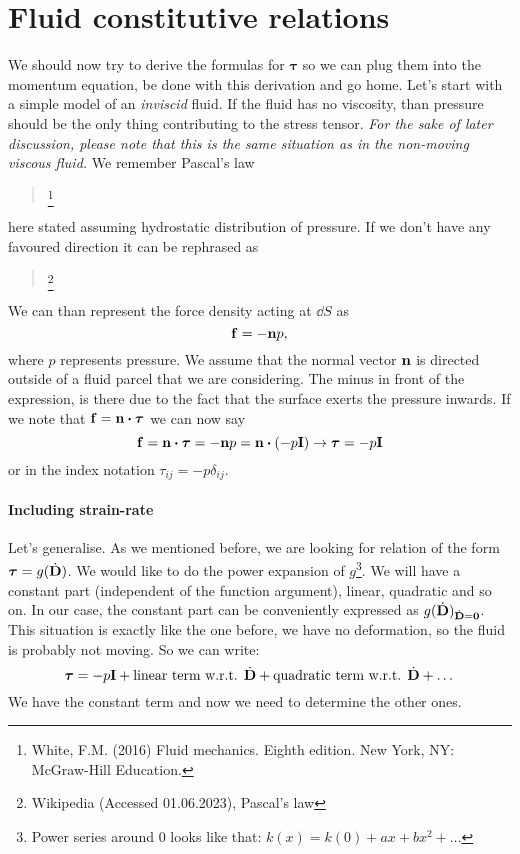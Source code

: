 \documentclass[a4paper]{article}
\begin{document}
\section{Fluid constitutive relations}

We should now try to derive the formulas for \(\bm{\tau}\) so we can plug
them into the momentum equation, be done with this derivation and go home.
Let's start with a simple model of an \emph{inviscid} fluid. If the fluid
has no viscosity, than pressure should be the only thing contributing to 
the stress tensor. \emph{For the sake of later discussion, please note that 
this is the same situation as in the non-moving viscous fluid.} We remember
Pascal's law
\begin{quote}
  \footnote{%
  White, F.M. (2016) Fluid mechanics. Eighth edition. New York, 
  NY: McGraw-Hill Education.}
\end{quote}
here stated assuming hydrostatic distribution of pressure. If we don't have 
any favoured direction it can be rephrased as
\begin{quote}
  \footnote{%
    Wikipedia (Accessed 01.06.2023), Pascal's law}
\end{quote}
We can than represent the force density acting at \(\dd{S}\) as 
\[
  \vb{f} = -\vb{n}p,
\]
where \(p\) represents pressure. We assume that the normal vector \(\vb{n}\) is
directed outside of a fluid parcel that we are considering. The minus in front 
of the expression, is there due to the fact that the surface exerts the pressure
inwards. If we note that \(\vb{f} = \vb{n}\dotproduct\bm{\tau}\) we can now say
\[
  \vb{f} = \vb{n}\dotproduct\bm{\tau} = -\vb{n}p = \vb{n}\dotproduct \qty( -p\vb{I} ) 
  \rightarrow \bm{\tau} = -p \vb{I}
\]
or in the index notation \(\tau_{ij} = -p \delta_{ij}\).

\paragraph{Including strain-rate}
Let's generalise. As we mentioned before, we are looking for 
relation of the form \(\bm{\tau} = g(\dot{\vb{D}})\). We would like to do the
power expansion of \(g\)\footnote{Power series around 0 looks like that: 
\(k(x) = k(0) + ax + bx^2 + \dots\)}. We will have a constant part (independent 
of the function argument), linear, quadratic and so on. In our case, the 
constant part can be conveniently expressed as
\(g(\dot{\vb{D}})_{\dot{\vb{D}} = \vb{0}}\). This situation is exactly like the 
one before, we have no deformation, so the fluid is probably not moving. So
we can write:
\[
  \bm{\tau} = -p\vb{I} + \text{linear term w.r.t. } \dot{\vb{D}} 
                       + \text{quadratic term w.r.t. } \dot{\vb{D}} + \dots
\]
We have the constant term and now we need to determine the other ones.
\end{document}
